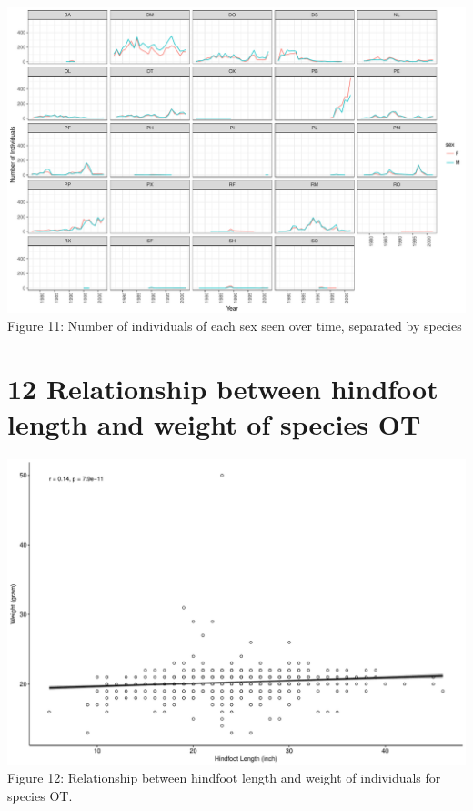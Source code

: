 \documentclass[]{article}
\newenvironment{Shaded}{\begin{snugshade}}{\end{snugshade}}
\newcommand{\KeywordTok}[1]{\textcolor[rgb]{0.13,0.29,0.53}{\textbf{#1}}}
\newcommand{\DataTypeTok}[1]{\textcolor[rgb]{0.13,0.29,0.53}{#1}}
\newcommand{\DecValTok}[1]{\textcolor[rgb]{0.00,0.00,0.81}{#1}}
\newcommand{\StringTok}[1]{\textcolor[rgb]{0.31,0.60,0.02}{#1}}
\newcommand{\OtherTok}[1]{\textcolor[rgb]{0.56,0.35,0.01}{#1}}
\newcommand{\OperatorTok}[1]{\textcolor[rgb]{0.81,0.36,0.00}{\textbf{#1}}}
\newcommand{\NormalTok}[1]{#1}
\begin{document}
\includegraphics{figs/individuals_sex_over_time-1.pdf} Figure 11: Number
of individuals of each sex seen over time, separated by species

\section{12 Relationship between hindfoot length and weight of species
OT}\label{relationship-between-hindfoot-length-and-weight-of-species-ot}

\begin{Shaded}
\end{Shaded}

\includegraphics{figs/OT_weight_hindfoot_length-1.pdf} Figure 12:
Relationship between hindfoot length and weight of individuals for
species OT.
\end{document}
